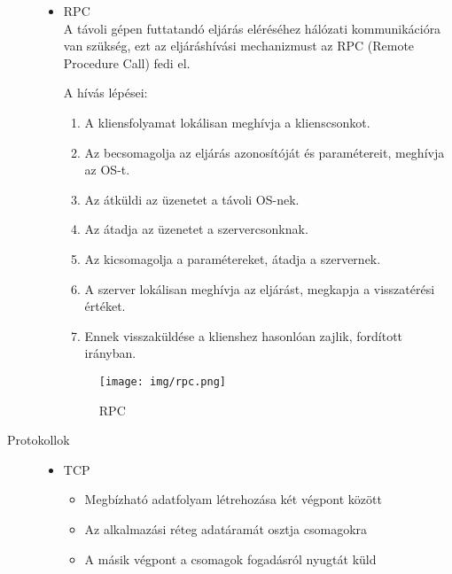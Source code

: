 \documentclass[margin=0px]{article}
\begin{document}
\begin{description}
\begin{itemize}
            \item RPC \\
                  A távoli gépen futtatandó eljárás eléréséhez hálózati kommunikációra van szükség, ezt az eljáráshívási mechanizmust az RPC (Remote Procedure Call) fedi el.

                  A hívás lépései:
                  \begin{enumerate}
                      \item A kliensfolyamat lokálisan meghívja a
                            klienscsonkot.
                      \item Az becsomagolja az eljárás azonosítóját
                            és paramétereit, meghívja az OS-t.
                      \item Az átküldi az üzenetet a távoli OS-nek.
                      \item Az átadja az üzenetet a
                            szervercsonknak.
                      \item Az kicsomagolja a paramétereket,
                            átadja a szervernek.
                      \item A szerver lokálisan meghívja az eljárást,
                            megkapja a visszatérési értéket.
                      \item Ennek visszaküldése a klienshez
                            hasonlóan zajlik, fordított irányban.
                  \end{enumerate}
                  \begin{figure}[H]
                      \centering
                      \texttt{[image: img/rpc.png]}
                      \caption{RPC}
                  \end{figure}
        \end{itemize}
    \item[Protokollok] \hfill
        \begin{itemize}
            \item TCP
                  \begin{itemize}
                      \item Megbízható adatfolyam létrehozása két végpont között
                      \item Az alkalmazási réteg adatáramát osztja csomagokra
                      \item A másik végpont a csomagok fogadásról nyugtát küld
                  \end{itemize}

\end{itemize}
\end{description}
\end{document}
